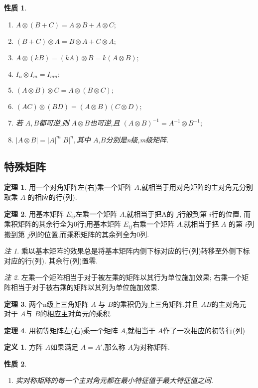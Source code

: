 \documentclass[a4paper,11pt]{article}%
\theoremstyle{remark}
\newtheorem*{remark}{注}
\theoremstyle{definition}
\newtheorem{theorem}{定理}[section]
\theoremstyle{definition}
\newtheorem*{definition}{定义}
\theoremstyle{plain}
\newtheorem*{property}{性质}
\newcommand*{\abs}[1]{\lvert #1 \rvert}
\begin{document}
\begin{property}
    \begin{enumerate}
        \item $A\otimes (B+C)=A\otimes B+A\otimes C;$
        \item $(B+C)\otimes A=B\otimes A + C\otimes A;$
        \item $A\otimes(kB)=(kA)\otimes B=k(A\otimes B);$
        \item $I_n\otimes I_m=I_{mn};$
        \item $(A\otimes B)\otimes C=A\otimes(B\otimes C);$
        \item $(AC)\otimes (BD)=(A\otimes B)(C\otimes D);$
        \item 若 $A,B$都可逆,则 $A\otimes B$也可逆,且 $(A\otimes B)^{-1}=A^{-1}\otimes B^{-1};$
        \item $\abs{A\otimes B}=\abs{A}^m\abs{B}^n,$其中 $A$,$B$分别是n级,m级矩阵.
    \end{enumerate}
\end{property}
\subsection{特殊矩阵}
\begin{theorem}
    用一个对角矩阵左(右)乘一个矩阵 $A$,就相当于用对角矩阵的主对角元分别取乘 $A$
    的相应的行(列).
\end{theorem}
\begin{theorem}
    用基本矩阵 $E _{ij}$左乘一个矩阵 $A$,就相当于把A的 $j$行般到第 $i$行的位置,
    而乘积矩阵的其余行全为0行;用基本矩阵 $E _{ij}$右乘一个矩阵 $A$,就相当于把 $A$
    的第 $i$列搬到第 $j$列的位置,而乘积矩阵的其余列全为0列.
\end{theorem}
\begin{remark}
    乘以基本矩阵的效果总是将基本矩阵内侧下标对应的行(列)转移至外侧下标对应的行(列).
    其余行(列)置零.
\end{remark}
\begin{remark}
    左乘一个矩阵相当于对于被左乘的矩阵以其行为单位施加效果;
    右乘一个矩阵相当于对于被右乘的矩阵以其列为单位施加效果.
\end{remark}
\begin{theorem}
    两个n级上三角矩阵 $A$ 与 $B$的乘积仍为上三角矩阵,并且 $AB$的主对角元
    对于 $A$与 $B$的相应主对角元的乘积.
\end{theorem}
\begin{theorem}
    用初等矩阵左(右)乘一个矩阵 $A$,就相当于 $A$作了一次相应的初等行(列)
\end{theorem}
\begin{definition}
    方阵 $A$如果满足 $A=A'$,那么称 $A$为对称矩阵.
\end{definition}
\begin{property}
    \begin{enumerate}
        \item 实对称矩阵的每一个主对角元都在最小特征值于最大特征值之间.
    \end{enumerate}
\end{property}
\end{document}
